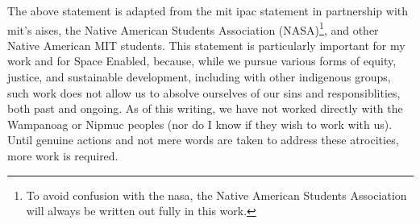 The above statement is adapted from the \ac{mit} \ac{ipac} statement in partnership with \ac{mit}'s \ac{aises}, the Native American Students Association (NASA)\footnote{To avoid confusion with the \acf{nasa}, the Native American Students Association will always be written out fully in this work.}, and other Native American MIT students. This statement is particularly important for my work and for Space Enabled, because, while we pursue various forms of equity, justice, and sustainable development, including with other indigenous groups, such work does not allow us to absolve ourselves of our sins and responsiblities, both past and ongoing. As of this writing, we have not worked directly with the Wampanoag or Nipmuc peoples (nor do I know if they wish to work with us). Until genuine actions and not mere words are taken to address these atrocities, more work is required.


